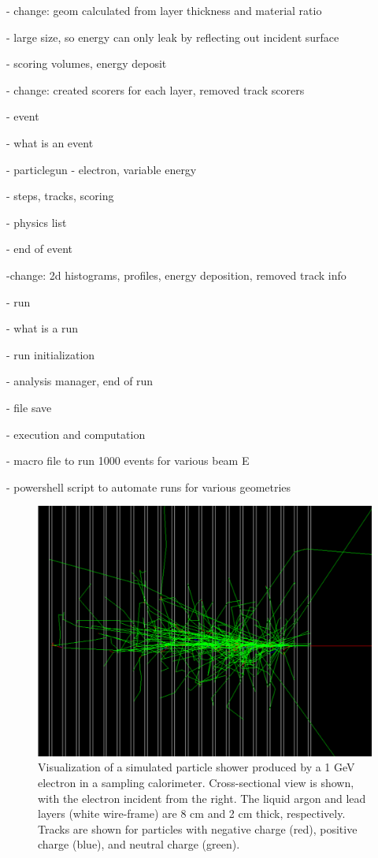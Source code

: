 \documentclass[%
 reprint,
 amsmath,amssymb,
 aps,
]{revtex4-2}
\begin{document}
        - change: geom calculated from layer thickness and material ratio

        - large size, so energy can only leak by reflecting out incident surface

    - scoring volumes, energy deposit

        - change: created scorers for each layer, removed track scorers

- event 

    - what is an event

    - particlegun - electron, variable energy

    - steps, tracks, scoring

    - physics list

    - end of event

        -change: 2d histograms, profiles, energy deposition, removed track info
        
- run 

    - what is a run

    - run initialization

    - analysis manager, end of run

        - file save

- execution and computation

    - macro file to run 1000 events for various beam E

    - powershell script to automate runs for various geometries

\begin{figure}[H]
\centering
\includegraphics[width=0.75\columnwidth]{shower.png}%
\caption{\label{fig:epsart} Visualization of a simulated particle shower produced by a 1 GeV electron in a sampling calorimeter. Cross-sectional view is shown, with the electron incident from the right. The liquid argon and lead layers (white wire-frame) are 8 cm and 2 cm thick, respectively. Tracks are shown for particles with negative charge (red), positive charge (blue), and neutral charge (green). }
\end{figure}
\end{document}
